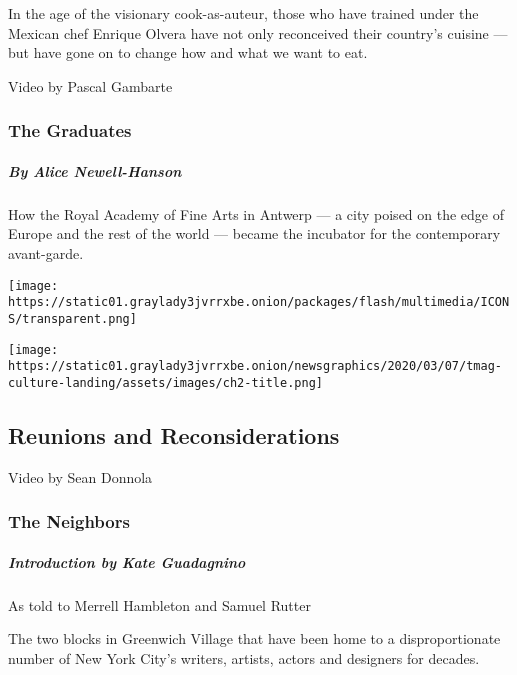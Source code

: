 In the age of the visionary cook-as-auteur, those who have trained under
the Mexican chef Enrique Olvera have not only reconceived their
country's cuisine --- but have gone on to change how and what we want to
eat.

\href{https://www.nytimes3xbfgragh.onion/interactive/2020/04/13/t-magazine/royal-academy-antwerp.html}{}

Video by Pascal Gambarte

\hypertarget{the-graduates}{%
\subsubsection{The Graduates}\label{the-graduates}}

\hypertarget{by-alice-newell-hanson}{%
\subparagraph{By Alice Newell-Hanson}\label{by-alice-newell-hanson}}

How the Royal Academy of Fine Arts in Antwerp --- a city poised on the
edge of Europe and the rest of the world --- became the incubator for
the contemporary avant-garde.

\texttt{[image: https://static01.graylady3jvrrxbe.onion/packages/flash/multimedia/ICONS/transparent.png]}

\texttt{[image: https://static01.graylady3jvrrxbe.onion/newsgraphics/2020/03/07/tmag-culture-landing/assets/images/ch2-title.png]}

\hypertarget{reunions-and-reconsiderations}{%
\subsection{Reunions and
Reconsiderations}\label{reunions-and-reconsiderations}}

\href{https://www.nytimes3xbfgragh.onion/interactive/2020/04/13/t-magazine/ninth-street-greenwich-village-neighbors.html}{}

Video by Sean Donnola

\hypertarget{the-neighbors}{%
\subsubsection{The Neighbors}\label{the-neighbors}}

\hypertarget{introduction-by-kate-guadagnino}{%
\subparagraph{Introduction by Kate
Guadagnino}\label{introduction-by-kate-guadagnino}}

As told to Merrell Hambleton and Samuel Rutter

The two blocks in Greenwich Village that have been home to a
disproportionate number of New York City's writers, artists, actors and
designers for decades.

